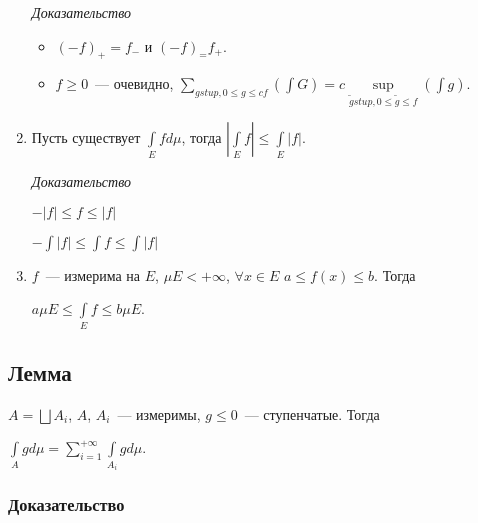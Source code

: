 \documentclass{article}
\begin{document}
\begin{enumerate}
                \textit{Доказательство}
                
                    \begin{itemize}
                    
                        \item $(-f)_+ = f_-$ и $(-f)_ = f_+$.
                    
                        \item $f \geqslant 0$~--- очевидно, $\sum\limits_{g stup, 0 \leqslant g \leqslant cf} \left( \int G \right) = c \sup\limits_{\widetilde{g} stup, 0 \leqslant \widetilde{g} \leqslant f} \left( \int g \right)$.
                        
                    \end{itemize}
                    
            \item Пусть существует $\int\limits_{E} f d \mu$, тогда $\left| \int\limits_{E} f \right| \leqslant \int\limits_{E} |f|$.
            
                \textit{Доказательство}
                
                    $- |f| \leqslant f \leqslant |f|$
                    
                    $- \int |f| \leqslant \int f \leqslant \int |f|$
                    
            \item $f$~--- измерима на $E$, $\mu E < +\infty$, $\forall x \in E$ $a \leqslant f(x) \leqslant b$. Тогда 
            
                $a \mu E \leqslant \int\limits_{E} f \leqslant b \mu E$.
                
        \end{enumerate}
        
    \subsection{Лемма}
    
        $A = \bigsqcup A_i$, $A$, $A_i$~--- измеримы, $g \leqslant 0$~--- ступенчатые. Тогда
        
        $\int\limits_{A} g d \mu = \sum\limits_{i = 1}^{+\infty} \int\limits_{A_i} g d \mu$.
        
        \subsubsection{Доказательство}
        
\end{document}

